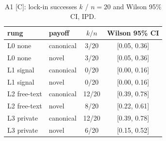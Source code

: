 \documentclass[runningheads]{llncs}
\newcommand{\tC}{\textcolor{blue!45!black}{\textsc{[C]}}}
\begin{document}
\begin{table}[h]
\centering
\caption{A1 \tC{}: lock-in successes $k$ / $n{=}20$ and Wilson 95\% CI, IPD.}
\label{tab:app-a1}
\small
\begin{tabular}{llcc}
\toprule
rung & payoff & $k/n$ & Wilson 95\% CI \\
\midrule
L0 none      & canonical & 3/20 & [0.05, 0.36] \\
L0 none      & novel     & 3/20 & [0.05, 0.36] \\
L1 signal    & canonical & 0/20 & [0.00, 0.16] \\
L1 signal    & novel     & 0/20 & [0.00, 0.16] \\
L2 free-text & canonical & 12/20 & [0.39, 0.78] \\
L2 free-text & novel     & 8/20 & [0.22, 0.61] \\
L3 private   & canonical & 12/20 & [0.39, 0.78] \\
L3 private   & novel     & 6/20 & [0.15, 0.52] \\
\bottomrule
\end{tabular}
\end{table}



\end{document}
